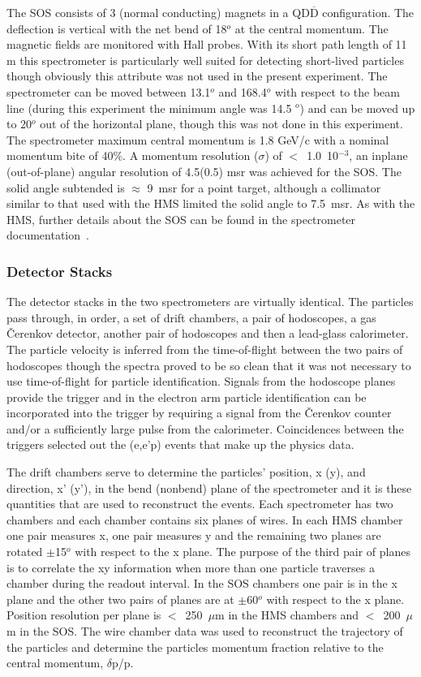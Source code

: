 \documentclass[aps,prl,twocolumn,showpacs,amsmath,amssymb,floats]{revtex4}
\begin{document}
The SOS consists of 3 (normal conducting) magnets in a QD$\overline{\mbox{D}}$ 
configuration.  The deflection is vertical with the net bend of 18$^o$ at the 
central momentum.  The magnetic fields are monitored with Hall probes. With its 
short path length of 11 m this spectrometer is particularly well suited for 
detecting short-lived particles though obviously this attribute was not used in 
the present experiment.  The spectrometer can be moved between 13.1$^o$ and 
168.4$^o$ with respect to the beam line (during this experiment the minimum angle was 14.5 $^o$) and can be moved up to 20$^o$ out of the 
horizontal plane, though this was not done in this experiment.  The 
spectrometer maximum central momentum is 1.8 GeV/c with a nominal 
momentum bite of 40\%. A momentum resolution ($\sigma$) of $<$~1.0~10$^{-3}$, 
an inplane (out-of-plane) angular resolution of 4.5(0.5) msr was achieved for 
the SOS. The solid angle subtended is  $\approx$ 9~msr for a point target, although a collimator similar 
to that used with the HMS limited the solid angle to 7.5~msr.  As with the HMS, 
further details about the SOS can be found 
in the spectrometer documentation~\cite{jlab3,moh3}.

\subsubsection*{Detector Stacks}

The detector stacks in the two spectrometers are virtually identical.  The 
particles pass through, in order, a set of drift chambers, a pair of hodoscopes, 
a gas \v{C}erenkov detector, another pair of hodoscopes and then a lead-glass 
calorimeter.  The particle velocity is inferred 
from the time-of-flight between the two pairs of hodoscopes though the spectra 
proved to be so clean that it was not necessary to use time-of-flight for 
particle identification.  Signals from the hodoscope planes provide the 
trigger and in the electron arm particle identification can be incorporated 
into the trigger by requiring a signal from the 
\v{C}erenkov counter and/or a sufficiently large pulse from the calorimeter.  
Coincidences between the triggers selected out the (e,e'p) events that make up 
the physics data.

The drift chambers serve to determine the particles' position, x (y), and 
direction, x' (y'), in the bend (nonbend) plane of the spectrometer and it is 
these quantities that are used to reconstruct the events.  Each spectrometer 
has two chambers and each chamber contains 
six planes of wires. In each HMS chamber one pair measures x, one pair measures y 
and the remaining two planes 
are rotated $\pm$15$^o$ with respect to the x plane.   
The purpose of the third pair of planes is to correlate the xy information when 
more than one particle traverses a 
chamber during the readout interval.  In the SOS chambers one pair is in the x plane 
and the other two pairs of planes are at $\pm$60$^o$ with respect to the x plane.
Position resolution per plane is 
$<$~250~$\mu$m in the HMS chambers and $<$~200~$\mu$m in the SOS.  The wire 
chamber data was used to reconstruct the trajectory of the particles and 
determine the particles momentum fraction relative to the central momentum, 
$\delta$p/p.
\end{document}
